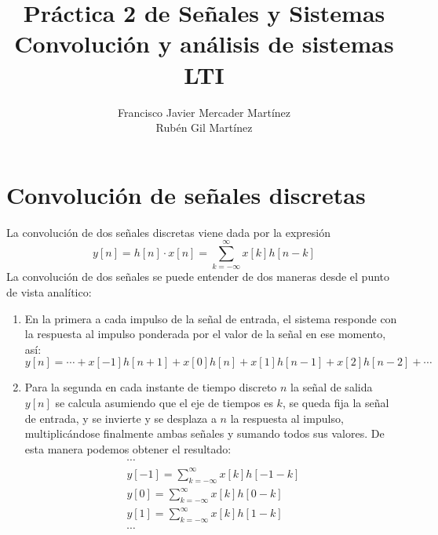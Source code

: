 \documentclass[12pt]{article}
\title{\textbf{\huge Práctica 2 de Señales y Sistemas}\\ Convolución y análisis de sistemas LTI}
\author{Francisco Javier Mercader Martínez\\ Rubén Gil Martínez}
\date{}
\begin{document}
	\maketitle
	\newpage
	\section{Convolución de señales discretas}
La convolución de dos señales discretas viene dada por la expresión \[ y[n]=h[n]\cdot x[n]=\sum_{k=-\infty}^{\infty}x[k]h[n-k] \]La convolución de dos señales se puede entender de dos maneras desde el punto de vista analítico:
\begin{enumerate}[label=\arabic*)]
	\item En la primera a cada impulso de la señal de entrada, el sistema responde con la respuesta al impulso ponderada por el valor de la señal en ese momento, así: \[ y[n]=\cdots+x[-1]h[n+1]+x[0]h[n]+x[1]h[n-1]+x[2]h[n-2]+\cdots \]
	\item Para la segunda en cada instante de tiempo discreto $n$ la señal de salida $y[n]$ se calcula asumiendo que el eje de tiempos es $k$, se queda fija la señal de entrada, y se invierte y  se desplaza a $n$ la respuesta al impulso, multiplicándose finalmente ambas señales y sumando todos sus valores. De esta manera podemos obtener el resultado:
	\[ \begin{array}{l}
		\cdots\\
		y[-1]=\sum_{k=-\infty}^{\infty}x[k]h[-1-k]\\
		y[0]=\sum_{k=-\infty}^{\infty}x[k]h[0-k]\\
		y[1]=\sum_{k=-\infty}^{\infty}x[k]h[1-k]\\
		\cdots
	\end{array} \]
\end{enumerate}
\end{document}
